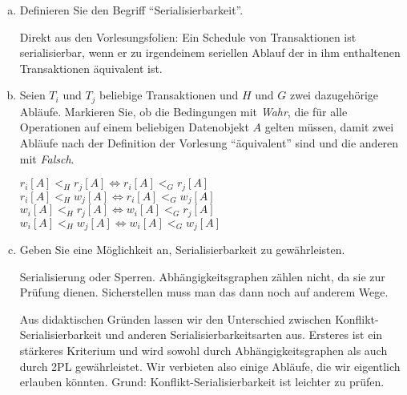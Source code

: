 \begin{enumerate}[a)]
\item Definieren Sie den Begriff "`Serialisierbarkeit"'.

\begin{solution}
Direkt aus den Vorlesungsfolien:
Ein Schedule von Transaktionen ist serialisierbar, wenn er zu irgendeinem seriellen Ablauf der in ihm enthaltenen Transaktionen äquivalent ist.
\end{solution}


\item Seien $T_i$ und $T_j$ beliebige Transaktionen und $H$ und $G$ zwei
  dazugehörige Abläufe. Markieren Sie, ob die Bedingungen mit \textit{Wahr}, die für alle
  Operationen auf einem beliebigen Datenobjekt $A$ gelten müssen, damit
  zwei Abläufe nach der Definition der Vorlesung "`äquivalent"' sind und die anderen mit \textit{Falsch}.

  \begin{description}
    \itemmc    $r_i[A] <_H r_j[A] \Leftrightarrow r_i[A] <_G r_j[A]$
    \itemmcsol $r_i[A] <_H w_j[A] \Leftrightarrow r_i[A] <_G w_j[A]$
    \itemmcsol $w_i[A] <_H r_j[A] \Leftrightarrow w_i[A] <_G r_j[A]$
    \itemmcsol $w_i[A] <_H w_j[A] \Leftrightarrow w_i[A] <_G w_j[A]$
  \end{description}

\item Geben Sie eine Möglichkeit an, Serialisierbarkeit zu gewährleisten.

\begin{solution}
Serialisierung oder Sperren.
Abhängigkeitsgraphen zählen nicht, da sie zur Prüfung dienen.
Sicherstellen muss man das dann noch auf anderem Wege.
\end{solution}

\begin{note}
Aus didaktischen Gründen lassen wir den Unterschied zwischen Konflikt-Serialisierbarkeit und anderen Serialisierbarkeitsarten aus.
Ersteres ist ein stärkeres Kriterium und wird sowohl durch Abhängigkeitsgraphen als auch durch 2PL gewährleistet.
Wir verbieten also einige Abläufe, die wir eigentlich erlauben könnten.
Grund: Konflikt-Serialisierbarkeit ist leichter zu prüfen.
\end{note}

\end{enumerate}
